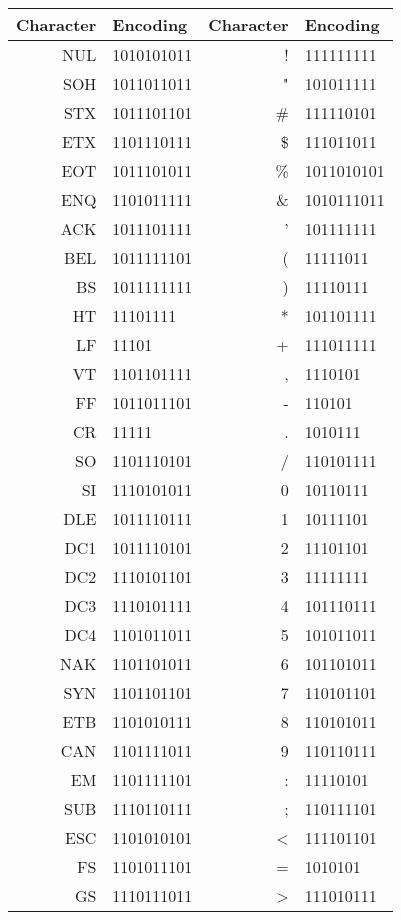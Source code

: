 \begin{longtable}{ r l || r l }
	Character & Encoding & Character & Encoding \\\hline
	NUL & 1010101011 				&	!   & 111111111  \\
	SOH & 1011011011 				&	"   & 101011111  \\
	STX & 1011101101 				&	\#  & 111110101  \\
	ETX & 1101110111 				&	\$  & 111011011  \\
	EOT & 1011101011 				&	\%  & 1011010101  \\
	ENQ & 1101011111 				&	\&  & 1010111011  \\
	ACK & 1011101111 				&	'   & 101111111  \\
	BEL & 1011111101 				&	(   & 11111011  \\
	BS  & 1011111111 				&	)   & 11110111  \\
	HT  & 11101111 					&	*   & 101101111  \\
	LF  & 11101 					&	+   & 111011111  \\
	VT  & 1101101111 				&	,   & 1110101  \\
	FF  & 1011011101 				&	-   & 110101  \\
	CR  & 11111 					&	.   & 1010111  \\
	SO  & 1101110101 				&	/   & 110101111  \\
	SI  & 1110101011 				&	0   & 10110111  \\
	DLE & 1011110111 				&	1   & 10111101  \\
	DC1 & 1011110101 				&	2   & 11101101  \\
	DC2 & 1110101101 				&	3   & 11111111  \\
	DC3 & 1110101111 				&	4   & 101110111  \\
	DC4 & 1101011011 				&	5   & 101011011  \\
	NAK & 1101101011 				&	6   & 101101011  \\
	SYN & 1101101101 				&	7   & 110101101  \\
	ETB & 1101010111 				&	8   & 110101011  \\
	CAN & 1101111011 				&	9   & 110110111  \\
	EM  & 1101111101 				&	:   & 11110101  \\
	SUB & 1110110111 				&	;   & 110111101  \\
	ESC & 1101010101 				&	<   & 111101101  \\
	FS  & 1101011101 				&	=   & 1010101  \\
	GS  & 1110111011 				&	>   & 111010111  \\

\end{longtable}
